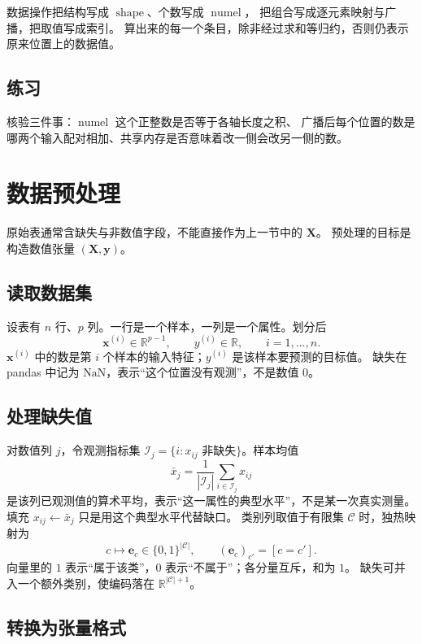 数据操作把结构写成 $\operatorname{shape}$、个数写成 $\operatorname{numel}$，
把组合写成逐元素映射与广播，把取值写成索引。
算出来的每一个条目，除非经过求和等归约，否则仍表示原来位置上的数据值。

\subsection{练习}

核验三件事：$\operatorname{numel}$ 这个正整数是否等于各轴长度之积、
广播后每个位置的数是哪两个输入配对相加、共享内存是否意味着改一侧会改另一侧的数。

\section{数据预处理}

原始表通常含缺失与非数值字段，不能直接作为上一节中的 $\bm{X}$。
预处理的目标是构造数值张量 $(\bm{X},\bm{y})$。

\subsection{读取数据集}

设表有 $n$ 行、$p$ 列。一行是一个样本，一列是一个属性。划分后
\[
\bm{x}^{(i)}\in\mathbb{R}^{p-1},\qquad y^{(i)}\in\mathbb{R},
\qquad i=1,\ldots,n.
\]
$\bm{x}^{(i)}$ 中的数是第 $i$ 个样本的输入特征；$y^{(i)}$ 是该样本要预测的目标值。
缺失在 pandas 中记为 $\mathrm{NaN}$，表示“这个位置没有观测”，不是数值 $0$。

\subsection{处理缺失值}

对数值列 $j$，令观测指标集 $\mathcal{I}_j=\{i:x_{ij}\text{ 非缺失}\}$。样本均值
\[
\bar{x}_j=\frac{1}{|\mathcal{I}_j|}\sum_{i\in\mathcal{I}_j}x_{ij}
\]
是该列已观测值的算术平均，表示“这一属性的典型水平”，不是某一次真实测量。
填充 $x_{ij}\leftarrow\bar{x}_j$ 只是用这个典型水平代替缺口。
类别列取值于有限集 $\mathcal{C}$ 时，独热映射为
\[
c\mapsto \bm{e}_c\in\{0,1\}^{|\mathcal{C}|},\qquad
(\bm{e}_c)_{c'}=[c=c'].
\]
向量里的 $1$ 表示“属于该类”，$0$ 表示“不属于”；各分量互斥，和为 $1$。
缺失可并入一个额外类别，使编码落在 $\mathbb{R}^{|\mathcal{C}|+1}$。

\subsection{转换为张量格式}


